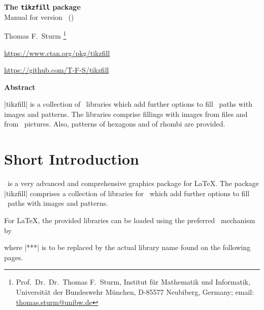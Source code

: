 \documentclass[a4paper,11pt]{article}
\begin{document}
\begin{center}
\begin{tcolorbox}[enhanced,hbox,tikznode,left=8mm,right=8mm,boxrule=0.4pt,
  colback=white,colframe=black!50!yellow,
  drop lifted shadow=black!50!yellow,arc is angular,
  before=\par\vspace*{5mm},after=\par\bigskip]
{\bfseries\LARGE The \texttt{tikzfill} package}\\[3mm]
{\large Manual for version \version\ (\datum)}
\end{tcolorbox}
{\large Thomas F.~Sturm%
  \footnote{Prof.~Dr.~Dr.~Thomas F.~Sturm, Institut f\"{u}r Mathematik und Informatik,
    Universit\"{a}t der Bundeswehr M\"{u}nchen, D-85577 Neubiberg, Germany;
     email: \href{mailto:thomas.sturm@unibw.de}{thomas.sturm@unibw.de}}\par\medskip
\normalsize\url{https://www.ctan.org/pkg/tikzfill}\par
\url{https://github.com/T-F-S/tikzfill}
}
\end{center}
\bigskip
\begin{absquote}
  \begin{center}\bfseries Abstract\end{center}
  |tikzfill| is a collection of \tikzname\ libraries which add further
  options to fill \tikzname\ paths with images and patterns.
  The libraries comprise fillings with images from files and from \tikzname\ pictures.
  Also, patterns of hexagons and of rhombi are provided.
\end{absquote}

\clearpage
\tableofcontents


\clearpage
\section{Short Introduction}\label{sec:intro}

\tikzname\ is a very advanced and comprehensive graphics package for \LaTeX.
The package |tikzfill| comprises a collection of libraries for \tikzname\, which
add further options to fill \tikzname\ paths with images and patterns.

For \LaTeX, the provided libraries can be loaded using the preferred
\tikzname\ mechanism by
\begin{dispListing*}{}
\usetikzlibrary{fill.***} %
\end{dispListing*}
where |***| is to be replaced by the actual library name found on the following pages.
\end{document}
